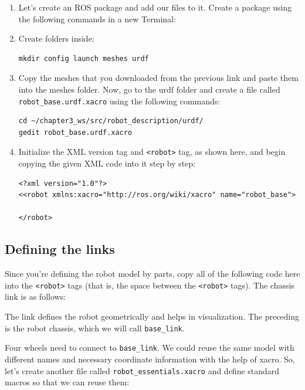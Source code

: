 \documentclass[letterpaper,pdftex]{article}
\begin{document}
\begin{enumerate}
\item Let's create an ROS package and add our files to it. Create a package using the following commands in a new Terminal: 

\item Create folders inside:
\begin{lstlisting}
mkdir config launch meshes urdf
\end{lstlisting}
\item Copy the meshes that you downloaded from the previous link and paste them into the meshes folder. Now, go to the urdf folder and create a file called \verb|robot_base.urdf.xacro| using the following commands:

\begin{lstlisting}
cd ~/chapter3_ws/src/robot_description/urdf/
gedit robot_base.urdf.xacro
\end{lstlisting}
\item Initialize the XML version tag and \verb|<robot>| tag, as shown here, and begin copying the given XML code into it step by step:
\begin{lstlisting}
<?xml version="1.0"?>
<<robot xmlns:xacro="http://ros.org/wiki/xacro" name="robot_base">
    
</robot>
\end{lstlisting}

\end{enumerate}

\subsection{Defining the links}

Since you're defining the robot model by parts, copy all of the following code here into the \verb|<robot>| tags (that is, the space between the \verb|<robot>| tags). The chassis link is as follows:



The link defines the robot geometrically and helps in visualization. The preceding is the robot chassis, which we will call \verb|base_link|.

Four wheels need to connect to \verb|base_link|. We could reuse the same model with different names and necessary coordinate information with the help of xacro. So, let's create another file called \verb|robot_essentials.xacro| and define standard macros so that we can reuse them:
\end{document}

